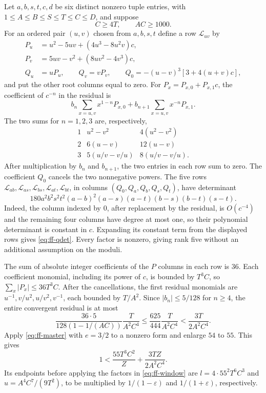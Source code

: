 \documentclass[12pt]{article}
\numberwithin{equation}{section}
\begin{document}
Let $a,b,s,t,c,d$ be six distinct nonzero tuple entries, with
$1\le A\le B\le S\le T\le C\le D$, and suppose
\begin{equation}\label{eq:ff-qguards}
 C\ge4T,\qquad AC\ge1000.
\end{equation}
For an ordered pair $(u,v)$ chosen from $a,b,s,t$ define a row $\mathcal L_{uv}$ by
\begin{align*}
 P_u&=u^2-5uv+(4u^3-8u^2v)c,\\
 P_v&=5uv-v^2+(8uv^2-4v^3)c,\\
 Q_u&=uP_u,\qquad Q_v=vP_v,\qquad
 Q_0=-(u-v)^3[3+4(u+v)c],
\end{align*}
and put the other root columns equal to zero.
For $P_x=P_{x,0}+P_{x,1}c$, the coefficient of $c^{-n}$ in the
residual is
\[
 b_n\sum_{x=u,v}x^{1-n}P_{x,0}
 +b_{n+1}\sum_{x=u,v}x^{-n}P_{x,1}.
\]
The two sums for $n=1,2,3$ are, respectively,
\[
 \begin{array}{c|cc}
 1&u^2-v^2&4(u^2-v^2)\\
 2&6(u-v)&12(u-v)\\
 3&5(u/v-v/u)&8(u/v-v/u).
 \end{array}
\]
After multiplication by $b_n$ and $b_{n+1}$, the two entries in each row sum to zero. The coefficient $Q_0$ cancels the two nonnegative powers.
The five rows
$\mathcal L_{ab},\mathcal L_{as},\mathcal L_{bs},
\mathcal L_{at},\mathcal L_{bt}$, in columns $(Q_0,Q_a,Q_b,Q_s,Q_t)$,
have determinant
\begin{equation}\label{eq:ff-qdet}
 180a^2b^2s^2t^2(a-b)^2(a-s)(a-t)(b-s)(b-t)(s-t).
\end{equation}
Indeed, the column indexed by $0$, after replacement by the residual, is $O(c^{-4})$ and the remaining four columns have degree at most one, so their polynomial determinant is
constant in $c$. Expanding its constant term from the displayed rows
gives \eqref{eq:ff-qdet}. Every factor is nonzero, giving rank five
without an additional assumption on the moduli.

The sum of absolute integer coefficients of the $P$ columns in each
row is $36$. Each coefficient monomial, including its power of $c$,
is bounded by $T^3C$, so $\sum_x|P_x|\le36T^3C$.
After the cancellations, the first residual monomials are
$u^{-1},v/u^2,u/v^2,v^{-1}$, each bounded by $T/A^2$.
Since $|b_n|\le5/128$ for $n\ge4$, the entire convergent residual is
at most
\[
 \frac{36\cdot5}{128(1-1/(AC))}\frac{T}{A^2C^4}
 \le\frac{625}{444}\frac{T}{A^2C^4}
 <\frac{3T}{2A^2C^4}.
\]
Apply \eqref{eq:ff-master} with $e=3/2$ to a nonzero form and enlarge
$54$ to $55$. This gives
\begin{equation}\label{eq:ff-Q}
 1<\frac{55T^3C^2}{Z}+\frac{3TZ}{2A^2C^4}.
\end{equation}
Its endpoints before applying the factors in \eqref{eq:ff-window} are
$l=4\cdot55^2T^6C^3$ and $u=A^4C^7/(9T^2)$, to be multiplied by $1/(1-\varepsilon)$ and $1/(1+\varepsilon)$, respectively.
\end{document}
